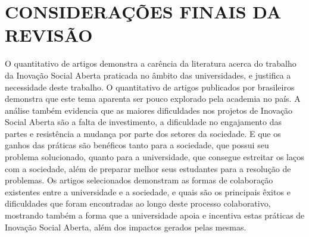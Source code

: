 

\section{CONSIDERAÇÕES FINAIS DA REVISÃO}

O quantitativo de artigos demonstra a carência da literatura acerca do trabalho da Inovação Social Aberta praticada no âmbito das universidades, e justifica a necessidade deste trabalho. O quantitativo de artigos publicados por brasileiros demonstra que este tema aparenta ser pouco explorado pela academia no país. A análise também evidencia que as maiores dificuldades nos projetos de Inovação Social Aberta são a falta de investimento, a dificuldade no engajamento das partes e resistência a mudança por parte dos setores da sociedade. E que os ganhos das práticas são benéficos tanto para a sociedade, que possui seu problema solucionado, quanto para a universidade, que consegue estreitar os laços com a sociedade, além de preparar melhor seus estudantes para a resolução de problemas. Os artigos selecionados demonstram as formas de colaboração existentes entre a universidade e a sociedade, e quais são os principais êxitos e dificuldades que foram encontradas ao longo deste processo colaborativo, mostrando também a forma que a universidade apoia e incentiva estas práticas de Inovação Social Aberta, além dos impactos gerados pelas mesmas.